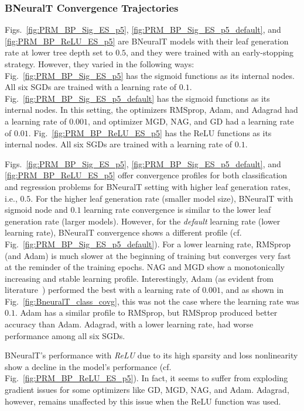 \documentclass[11pt,a4paper]{article}
\begin{document}
\subsubsection{BNeuralT Convergence Trajectories}
    Figs.~\ref{fig:PRM_BP_Sig_ES_p5}, 
    \ref{fig:PRM_BP_Sig_ES_p5_default}, and
    \ref{fig:PRM_BP_ReLU_ES_p5}
    are BNeuralT models with their leaf generation rate at lower tree depth set to $0.5$, and they were trained with an early-stopping strategy. However, they varied in the following ways:
Fig.~\ref{fig:PRM_BP_Sig_ES_p5} has the sigmoid functions as its internal nodes. All six SGDs are trained with a learning rate of $0.1$. 
Fig.~\ref{fig:PRM_BP_Sig_ES_p5_default} has the sigmoid functions as its internal nodes. In this setting, the optimizers RMSprop, Adam, and Adagrad had a learning rate of $0.001$, and optimizer MGD, NAG, and GD  had a learning rate of $0.01$.
Fig.~\ref{fig:PRM_BP_ReLU_ES_p5} has the ReLU functions as its internal nodes. All six SGDs are trained with a learning rate of $0.1$. 
    
    Figs.~\ref{fig:PRM_BP_Sig_ES_p5}, \ref{fig:PRM_BP_Sig_ES_p5_default}, and
    \ref{fig:PRM_BP_ReLU_ES_p5} 
offer convergence profiles for both classification and regression problems for BNeuralT setting with higher leaf generation rates, i.e., $0.5$. For the higher leaf generation rate (smaller model size), BNeuralT with sigmoid node and $0.1$ learning rate convergence is similar to the lower leaf generation rate (larger models). However, for the \textit{default} learning rate (lower learning rate), BNeuralT convergence shows a different profile (cf.  Fig.~\ref{fig:PRM_BP_Sig_ES_p5_default}). For a lower learning rate, RMSprop (and Adam) is much slower at the beginning of training but converges very fast at the reminder of the training epochs. NAG and MGD show a monotonically increasing and stable learning profile. Interestingly, Adam (as evident from literature~\citep{diederik2015adam}) performed the best with a learning rate of $0.001$,  and as shown in Fig.~\ref{fig:BneuralT_class_covg}, this was not the case where the learning rate was $0.1$. Adam has a similar profile to RMSprop, but RMSprop produced better accuracy than Adam. Adagrad, with a lower learning rate, had worse performance among  all six SGDs.  
    
    BNeuralT's performance with \textit{ReLU} due to its high sparsity and loss nonlinearity show a decline in the model's performance (cf. Fig.~\ref{fig:PRM_BP_ReLU_ES_p5}). In fact, it seems to suffer from exploding gradient issues for some optimizers like GD, MGD, NAG, and Adam. Adagrad, however, remains unaffected by this issue when the ReLU function was used.
    
\end{document}
